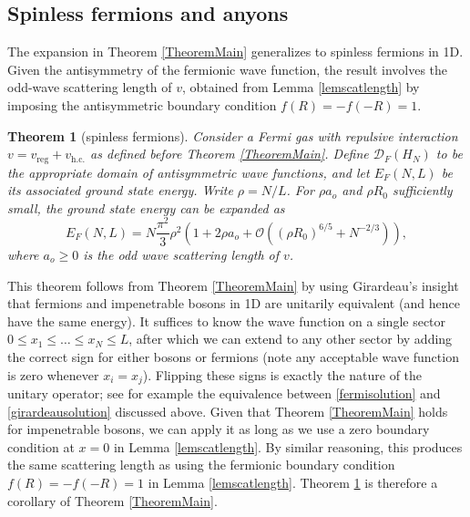 \documentclass[a4paper,11pt]{article}
\newtheorem{theorem}{Theorem}
\numberwithin{equation}{section}
\begin{document}
\subsection{Spinless fermions and anyons}
\label{SecOthersymmetries}
The expansion in Theorem \ref{TheoremMain} generalizes to spinless fermions in 1D. Given the antisymmetry of the fermionic wave function, the result involves the odd-wave scattering length of $v$, obtained from Lemma \ref{lemscatlength} by imposing the antisymmetric boundary condition $f(R)=-f(-R)=1$.
\begin{theorem}[spinless fermions]\label{TheoremFermion}
Consider a Fermi gas with repulsive interaction  $v=v_{\text{reg}}+v_{\text{h.c.}}$ as defined before Theorem \ref{TheoremMain}. Define $\mathcal{D}_F(H_N)$ to be the appropriate domain of antisymmetric wave functions, and let $ E_F(N,L)$ be its associated ground state energy. Write $\rho=N/L$. For $\rho a_o$ and $\rho R_0$ sufficiently small, the ground state energy can be expanded as 
\begin{equation}
E_F(N,L)=N\frac{\pi^2}{3}\rho^2\left(1+2\rho a_o+\mathcal{O}\left(\left(\rho R_0\right)^{6/5}+N^{-2/3}\right)\right),
\end{equation}
where $ a_o\geq0 $ is the odd wave scattering length of $v$. 
\end{theorem}

This theorem follows from Theorem \ref{TheoremMain} by using Girardeau's insight \cite{girardeau1960relationship} that fermions and impenetrable bosons in 1D are unitarily equivalent (and hence have the same energy). It suffices to know the wave function on a single sector $0\leq x_1\leq \dots\leq x_N\leq L$, after which we can extend to any other sector by adding the correct sign for either bosons or fermions (note any acceptable wave function is zero whenever $x_i=x_j$). Flipping these signs is exactly the nature of the unitary operator; see for example the equivalence between \eqref{fermisolution} and \eqref{girardeausolution} discussed above. Given that Theorem \ref{TheoremMain} holds for impenetrable bosons, we can apply it as long as we use a zero boundary condition at $x=0$ in Lemma \ref{lemscatlength}. By similar reasoning, this produces the same scattering length as using the fermionic boundary condition $f(R)=-f(-R)=1$ in Lemma \ref{lemscatlength}. Theorem \ref{TheoremFermion} is therefore a corollary of Theorem \ref{TheoremMain}.
\end{document}
